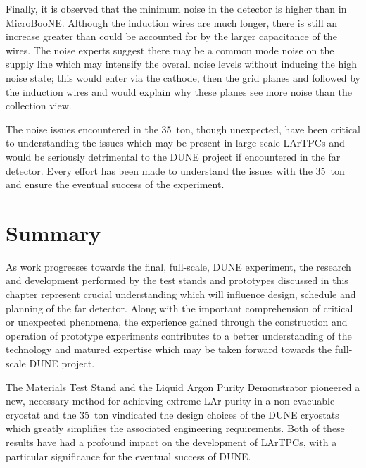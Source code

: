 Finally, it is observed that the minimum noise in the detector is higher than in MicroBooNE.  Although the induction wires are much longer, there is still an increase greater than could be accounted for by the larger capacitance of the wires.  The noise experts suggest there may be a common mode noise on the supply line which may intensify the overall noise levels without inducing the high noise state; this would enter via the cathode, then the grid planes and followed by the induction wires and would explain why these planes see more noise than the collection view.

The noise issues encountered in the 35~ton, though unexpected, have been critical to understanding the issues which may be present in large scale LArTPCs and would be seriously detrimental to the DUNE project if encountered in the far detector.  Every effort has been made to understand the issues with the 35~ton and ensure the eventual success of the experiment.

\section{Summary}\label{sec:35tonSummary}

As work progresses towards the final, full-scale, DUNE experiment, the research and development performed by the test stands and prototypes discussed in this chapter represent crucial understanding which will influence design, schedule and planning of the far detector.  Along with the important comprehension of critical or unexpected phenomena, the experience gained through the construction and operation of prototype experiments contributes to a better understanding of the technology and matured expertise which may be taken forward towards the full-scale DUNE project.

The Materials Test Stand and the Liquid Argon Purity Demonstrator pioneered a new, necessary method for achieving extreme LAr purity in a non-evacuable cryostat and the 35~ton vindicated the design choices of the DUNE cryostats which greatly simplifies the associated engineering requirements.  Both of these results have had a profound impact on the development of LArTPCs, with a particular significance for the eventual success of DUNE.

